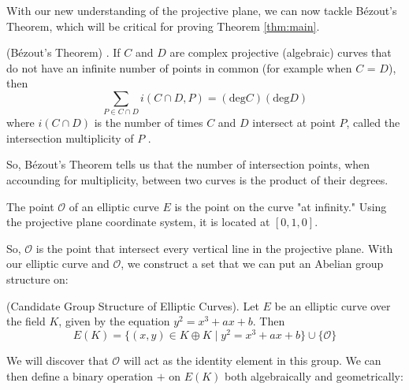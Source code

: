 \documentclass[]{math_paper}
\begin{document}
With our new understanding of the projective plane, we can now tackle Bézout's Theorem, which will be critical for proving Theorem \ref{thm:main}.

\begin{theorem} (Bézout's Theorem) \cite{Fitchett}. If $C$ and $D$ are complex projective (algebraic) curves that do not have an infinite number of points in common (for example when $C$ = $D$), then \begin{equation*}
        \sum_{P \in C \cap D}i(C \cap D, P) = (\mathrm{deg}C)(\mathrm{deg}D)
    \end{equation*}
    where $i(C \cap D)$ is the number of times $C$ and $D$ intersect at point $P$, called the intersection multiplicity of $P$ \cite{nichols2013intersection}.
\end{theorem}

So, Bézout's Theorem tells us that the number of intersection points, when accounding for multiplicity, between two curves is the product of their degrees.
\begin{definition} The point $\mathcal{O}$ of an elliptic curve $E$ is the point on the curve "at infinity." Using the projective plane coordinate system, it is located at $[0, 1, 0]$.
\end{definition}

So, $\mathcal{O}$ is the point that intersect every vertical line in the projective plane. With our elliptic curve and $\mathcal{O}$, we construct a set that we can put an Abelian group structure on:

\begin{definition} (Candidate Group Structure of Elliptic Curves). Let $E$ be an elliptic curve over the field $K$, given by the equation $y^2 = x^3 + ax + b$. Then
    $$E(K) = \{(x, y) \in K \oplus K \mid y^2 = x^3 + ax + b\} \cup \{\mathcal{O}\}$$
\end{definition}

We will discover that $\mathcal{O}$ will act as the identity element in this group. We can then define a binary operation $+$ on $E(K)$ both algebraically and geometrically:
\end{document}
